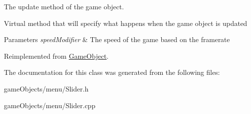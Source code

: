 The update method of the game object. 

Virtual method that will specify what happens when the game object is updated 
\begin{DoxyParams}{Parameters}
{\em speed\+Modifier} & The speed of the game based on the framerate \\
\hline
\end{DoxyParams}


Reimplemented from \hyperlink{class_game_object_acf6423054877d1344b6e0b1f4e740df5}{Game\+Object}.



The documentation for this class was generated from the following files\+:\begin{DoxyCompactItemize}
\item 
game\+Objects/menu/Slider.\+h\item 
game\+Objects/menu/Slider.\+cpp\end{DoxyCompactItemize}
